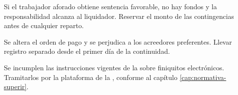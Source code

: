 {Si el trabajador aforado obtiene sentencia favorable, no hay fondos y la responsabilidad
alcanza al liquidador.}
{Reservar el monto de las contingencias antes de cualquier reparto.}

{Se altera el orden de pago y se perjudica a los acreedores preferentes.}
{Llevar registro separado desde el primer día de la continuidad.}

{Se incumplen las instrucciones vigentes de la \superir{} sobre finiquitos electrónicos.}
{Tramitarlos por la plataforma de la \dt{}, conforme al capítulo
\ref{cap:normativa-superir}.}
